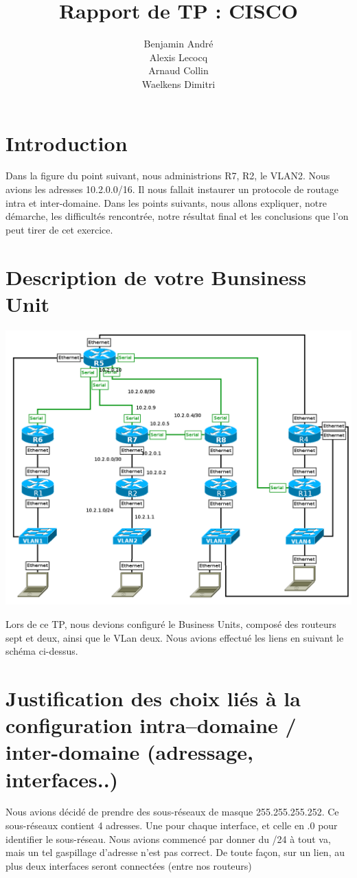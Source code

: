 \documentclass{article}
\author{Benjamin André\\Alexis Lecocq\\Arnaud Collin\\Waelkens Dimitri}
\title{Rapport de TP : CISCO}
\begin{document}
\maketitle

\section{Introduction}%
Dans la figure du point suivant, nous administrions R7, R2, le VLAN2. Nous avions les adresses 10.2.0.0/16. Il nous fallait instaurer un protocole de routage intra et inter-domaine.
Dans les points suivants, nous allons expliquer, notre démarche, les difficultés rencontrée, notre résultat final et les conclusions que l'on peut tirer de cet exercice.

\section{Description de votre Bunsiness Unit}

\includegraphics[scale=0.2]{image2.png}

Lors de ce TP, nous devions configuré le Business Units, composé des routeurs sept et deux, ainsi que le VLan deux. Nous avions effectué les liens en suivant le schéma ci-dessus.


\section{Justification des choix liés à la configuration intra--domaine / inter-domaine (adressage, interfaces..)}
Nous avions décidé de prendre des sous-réseaux de masque 255.255.255.252. Ce sous-réseaux contient 4 adresses. Une pour chaque interface, et celle en .0 pour identifier le sous-réseau.
Nous avions commencé par donner du /24 à tout va, mais un tel gaspillage d'adresse n'est pas correct. De toute façon, sur un lien, au plus deux interfaces seront connectées (entre nos routeurs)
\end{document}
